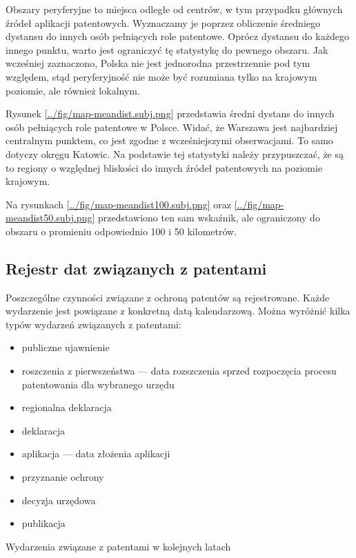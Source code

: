 Obszary peryferyjne to miejsca odległe od centrów, w tym przypadku
głównych źródeł aplikacji patentowych. Wyznaczamy je poprzez obliczenie
średniego dystansu do innych osób pełniących role patentowe.
Oprócz dystansu do każdego innego punktu, warto jest ograniczyć
tę statystykę do pewnego obszaru. Jak wcześniej zaznaczono, Polska
nie jest jednorodna przestrzennie pod tym względem, stąd peryferyjność
nie może być rozumiana tylko na krajowym poziomie, ale również lokalnym.

Rysunek \ref{../fig/map-meandist.subj.png} przedstawia średni dystans
do innych osób pełniących role patentowe w Polsce. Widać, że Warszawa
jest najbardziej centralnym punktem, co jest zgodne z wcześniejszymi
obserwacjami. To samo dotyczy okręgu Katowic. Na podstawie tej statystyki 
należy przypuszczać, że są to regiony o względnej bliskości 
do innych źródeł patentowych na poziomie krajowym.

Na rysunkach \ref{../fig/map-meandist100.subj.png} oraz
\ref{../fig/map-meandist50.subj.png} przedstawiono ten sam
wskaźnik, ale ograniczony do obszaru o promieniu odpowiednio 100 i 50 kilometrów.



\subsection{Rejestr dat związanych z patentami}

Poszczególne czynności związane z ochroną patentów są rejestrowane.
Każde wydarzenie jest powiązane z konkretną datą kalendarzową.
Można wyróżnić kilka typów wydarzeń związanych z patentami:

\begin{multicols}{2}

\begin{itemize}
\item publiczne ujawnienie 
\item roszczenia z pierwszeństwa  --- 
      data rozszczenia sprzed rozpoczęcia procesu patentowania dla wybranego urzędu
\item regionalna deklaracja 
\item deklaracja 
\item aplikacja  --- data złożenia aplikacji
\item przyznanie ochrony 
\item decyzja urzędowa
\item publikacja
\end{itemize}

\columnbreak
{}
{Wydarzenia związane z patentami w kolejnych latach}

\end{multicols}

